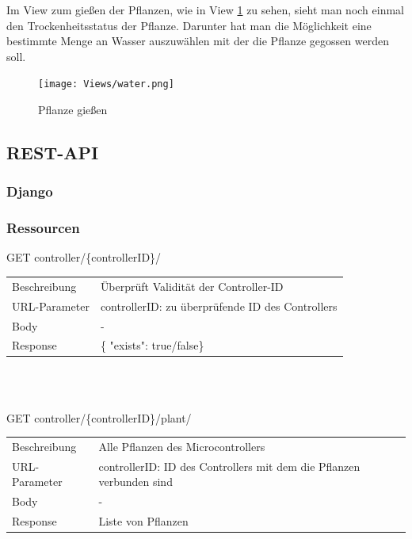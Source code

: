 Im View zum gießen der Pflanzen, wie in View \ref{water} zu sehen, sieht man noch einmal den Trockenheitsstatus der Pflanze. Darunter hat man die Möglichkeit eine bestimmte Menge an Wasser auszuwählen mit der die Pflanze gegossen werden soll. 
\begin{figure}[H]
    \centering
    \texttt{[image: Views/water.png]}
    \caption{Pflanze gießen}
    \label{water}
\end{figure}

    \subsection{REST-API}

        \subsubsection{Django}
        \subsubsection{Ressourcen}
        \newcommand{\tabitem}{~~\llap{\textbullet}~~}
     \begin{minipage}{\textwidth}
             GET controller/\{controllerID\}/ 
        
          \begin{tabularx}{\textwidth}{lX}
                \toprule Beschreibung & Überprüft Validität der Controller-ID \\
                URL-Parameter & controllerID: zu überprüfende ID des Controllers \\
                Body & - \\
                Response & \{ "exists": true/false\}
            \end{tabularx}
    \end{minipage}\\\\
        
     \begin{minipage}{\textwidth}
            GET controller/\{controllerID\}/plant/ 

          \begin{tabularx}{\textwidth}{lX}
                \toprule Beschreibung & Alle Pflanzen des Microcontrollers \\
                URL-Parameter & controllerID: ID des Controllers mit dem die Pflanzen verbunden sind \\
                Body & - \\
                Response & Liste von Pflanzen
            \end{tabularx}
    \end{minipage}\\\\
        
